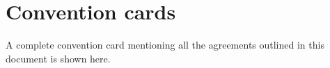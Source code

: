 \appendix

\chapter{Convention cards}

A complete convention card mentioning all the agreements outlined in this
document is shown here.





